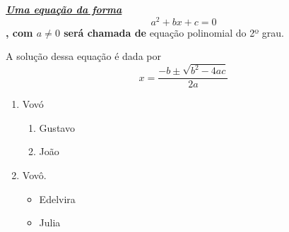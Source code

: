 \documentclass[a4paper,12pt]{article}
\begin{document}
\textbf{\textit{\underline{Uma equação da forma}} $$a^2 + bx + c = 0$$, com $a \neq 0$ será chamada de} equação polinomial do 2º grau.

A solução dessa equação é dada por
$$x = \frac{-b \pm \sqrt{b^2 - 4ac}}{2a}$$

\begin{enumerate}
\item Vov\' o 
\begin{enumerate}
\item Gustavo
\item João
\end{enumerate}
\item Vov\^ o.
\begin{itemize}
\item Edelvira
\item Julia
\end{itemize}
\end{enumerate}
\end{document}
